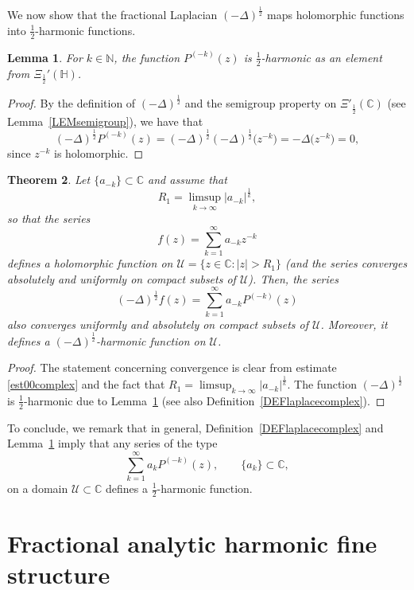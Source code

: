 \documentclass[reqno,11pt]{amsart}
\newtheorem{theorem}{Theorem}[section]
\newtheorem{lemma}[theorem]{Lemma}
\theoremstyle{definition}
\begin{document}
We now show that the fractional Laplacian $(-\Delta)^\frac{1}{2}$ maps holomorphic functions into $\frac{1}{2}$-harmonic functions.

\begin{lemma}
	\label{LEMmonomials12harm}
	For $k\in \mathbb{N}$, the function $P^{(-k)}(z)$ is $\frac{1}{2}$-harmonic as an element from $\Xi_{\frac{1}{2}}'(\mathbb{H})$.
\end{lemma}
\begin{proof}
	By the definition of $(-\Delta)^\frac{1}{2}$ and the semigroup property on $\Xi'_\frac{1}{2}(\mathbb{C})$ (see Lemma~\ref{LEMsemigroup}), we have that
	\[
	(-\Delta)^\frac{1}{2} P^{(-k)}(z) = (-\Delta)^\frac{1}{2} (-\Delta)^\frac{1}{2} \big(z^{-k}\big) = -\Delta \big(z^{-k}\big)=0,
	\]
	since $z^{-k}$ is holomorphic.
\end{proof}


\begin{theorem}
	\label{main1complex}
	Let $\{a_{-k}\}\subset \mathbb{C}$ and assume that
	\[
	R_1= \limsup_{k\to \infty} |a_{-k}|^\frac{1}{k},
	\]
	so that the series
	\[
	f(z)=\sum_{k=1}^\infty a_{-k} z^{-k}
	\]
	defines a holomorphic function on $\mathcal{U}= \{z\in \mathbb{C}:|z|>R_1\}$ (and the series converges absolutely and uniformly on compact subsets of  $\mathcal{U}$). Then, the series
	\[
	(-\Delta)^\frac{1}{2} f(z) =\sum_{k=1}^\infty a_{-k} P^{(-k)}(z)
	\]
	also converges uniformly and absolutely on compact subsets of $\mathcal{U}$. Moreover, it defines a $(-\Delta)^\frac{1}{2}$-harmonic function on $\mathcal{U}$.
\end{theorem}
\begin{proof}
	The statement concerning convergence is clear from estimate \eqref{est00complex} and  the fact that $R_1= \limsup_{k\to \infty} |a_{-k}|^\frac{1}{k}$. The function $(-\Delta)^\frac{1}{2}$ is $\frac{1}{2}$-harmonic due to Lemma~\ref{LEMmonomials12harm} (see also Definition~\ref{DEFlaplacecomplex}).
\end{proof}

To conclude, we remark that in general, Definition~\ref{DEFlaplacecomplex} and Lemma~\ref{LEMmonomials12harm} imply that any series of the type
\[
\sum_{k=1}^\infty a_{k}  P^{(-k)}(z) ,\qquad \{a_k\}\subset \mathbb{C},
\]
on a domain $\mathcal{U}\subset \mathbb{C}$ defines a $\frac{1}{2}$-harmonic function.


\section{Fractional analytic harmonic fine structure}\label{FRACLAPCIAN}
\end{document}
